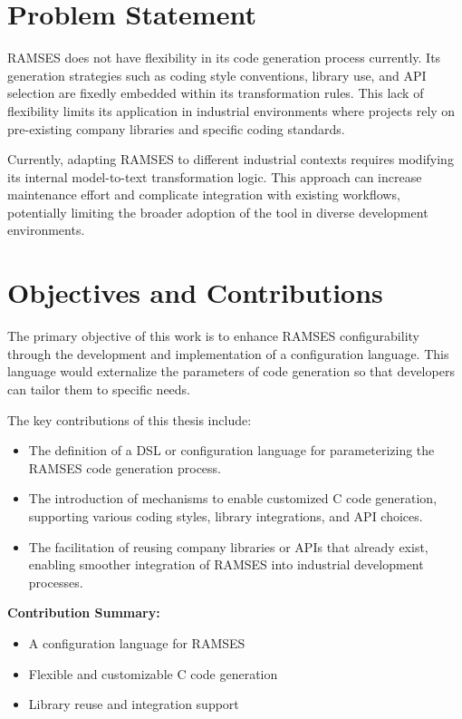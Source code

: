 \section{Problem Statement}

\gls{RAMSES} does not have flexibility in its code generation process currently. Its generation strategies such as coding style conventions, library use, and \gls{API} selection are fixedly embedded within its transformation rules. This lack of flexibility limits its application in industrial environments where projects rely on pre-existing company libraries and specific coding standards.
\par
Currently, adapting \gls{RAMSES} to different industrial contexts requires modifying its internal model-to-text transformation logic. This approach can increase maintenance effort and complicate integration with existing workflows, potentially limiting the broader adoption of the tool in diverse development environments. 


\section{Objectives and Contributions}

The primary objective of this work is to enhance \gls{RAMSES} configurability through the development and implementation of a configuration language. This language would externalize the parameters of code generation so that developers can tailor them to specific needs.

The key contributions of this thesis include:
\begin{itemize}
	\item The definition of a \gls{DSL} or configuration language for parameterizing the \gls{RAMSES} code generation process.
	\item The introduction of mechanisms to enable customized C code generation, supporting various coding styles, library integrations, and \gls{API} choices.
	\item The facilitation of reusing company libraries or \gls{API}s that already exist, enabling smoother integration of \gls{RAMSES} into industrial development processes.
\end{itemize}

\begin{tcolorbox}[colback=blue!5]
	\textbf{Contribution Summary:}
	\begin{itemize}
		\item A configuration language for \gls{RAMSES}
		\item Flexible and customizable C code generation
		\item Library reuse and integration support
	\end{itemize}
\end{tcolorbox}



